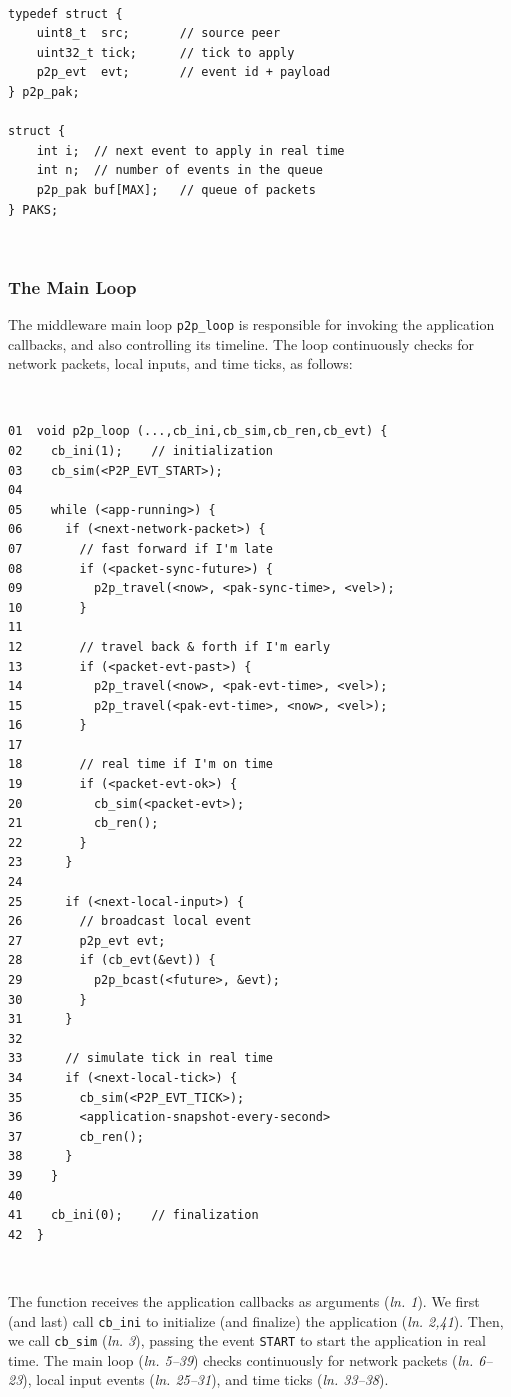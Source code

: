 \documentclass[10pt,journal,compsoc]{IEEEtran}
\newcommand{\code}[1]  {\texttt{\small{#1}}}
\newcommand{\lin}[1]{(\emph{ln. #1}\xspace)}
\begin{document}
{\footnotesize
~
\begin{verbatim}
typedef struct {
    uint8_t  src;       // source peer
    uint32_t tick;      // tick to apply
    p2p_evt  evt;       // event id + payload
} p2p_pak;

struct {
    int i;  // next event to apply in real time
    int n;  // number of events in the queue
    p2p_pak buf[MAX];   // queue of packets
} PAKS;
\end{verbatim}
~
}

\subsubsection{The Main Loop}
\label{sec.tml.middleware.loop}

The middleware main loop \code{p2p\_loop} is responsible for invoking the
application callbacks, and also controlling its timeline.
The loop continuously checks for network packets, local inputs, and time ticks,
as follows:

{\footnotesize
~
\begin{verbatim}
01  void p2p_loop (...,cb_ini,cb_sim,cb_ren,cb_evt) {
02    cb_ini(1);    // initialization
03    cb_sim(<P2P_EVT_START>);
04
05    while (<app-running>) {
06      if (<next-network-packet>) {
07        // fast forward if I'm late
08        if (<packet-sync-future>) {
09          p2p_travel(<now>, <pak-sync-time>, <vel>);
10        }
11
12        // travel back & forth if I'm early
13        if (<packet-evt-past>) {
14          p2p_travel(<now>, <pak-evt-time>, <vel>);
15          p2p_travel(<pak-evt-time>, <now>, <vel>);
16        }
17
18        // real time if I'm on time
19        if (<packet-evt-ok>) {
20          cb_sim(<packet-evt>);
21          cb_ren();
22        }
23      }
24
25      if (<next-local-input>) {
26        // broadcast local event
27        p2p_evt evt;
28        if (cb_evt(&evt)) {
29          p2p_bcast(<future>, &evt);
30        }
31      }
32
33      // simulate tick in real time
34      if (<next-local-tick>) {
35        cb_sim(<P2P_EVT_TICK>);
36        <application-snapshot-every-second>
37        cb_ren();
38      }
39    }
40
41    cb_ini(0);    // finalization
42  }
\end{verbatim}
~
}

The function receives the application callbacks as arguments \lin{1}.
We first (and last) call \code{cb\_ini} to initialize (and finalize) the
application \lin{2,41}.
Then, we call \code{cb\_sim} \lin{3}, passing the event \code{START} to start
the application in real time.
The main loop \lin{5--39} checks continuously for network packets \lin{6--23},
local input events \lin{25--31}, and time ticks \lin{33--38}.
\end{document}
